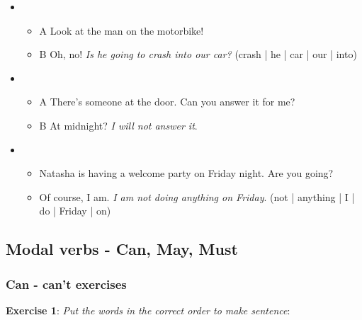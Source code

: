 \begin{itemize}
\item
\begin{itemize}
\item A Look at the man on the motorbike!
\item B Oh, no! \textit{Is he going to crash into our car?} (crash | he | car | our | into)
\end{itemize}

\item
\begin{itemize}
\item A There's someone at the door. Can you answer it for me?
\item B At midnight? \textit{I will not answer it}.
\end{itemize}

\item
\begin{itemize}
\item Natasha is having a welcome party on Friday night. Are you going?
\item Of course, I am. \textit{I am not doing anything on Friday}. (not | anything | I | do | Friday | on)
\end{itemize}

\end{itemize}



\subsection{Modal verbs - Can, May, Must}

\subsubsection{Can - can't exercises}

\textbf{Exercise 1}: \textit{Put the words in the correct order to make sentence}:

